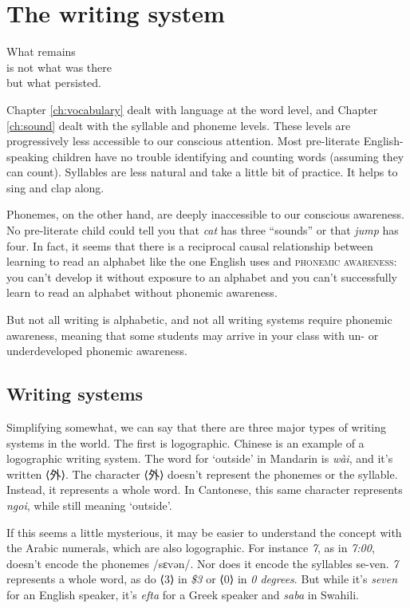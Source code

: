\chapter{The writing system}

\epigraph{What remains\\
is not what was there\\
but what persisted.}{}

Chapter \ref{ch:vocabulary} dealt with language at the word level, and Chapter \ref{ch:sound} dealt with the syllable and phoneme levels. These levels are progressively less accessible to our conscious attention. Most pre-literate English-speaking children have no trouble identifying and counting words (assuming they can count). Syllables are less natural and take a little bit of practice. It helps to sing and clap along. 

Phonemes, on the other hand, are deeply inaccessible to our conscious awareness. No pre-literate child could tell you that \textit{cat} has three ``sounds'' or that \textit{jump} has four. In fact, it seems that there is a reciprocal causal relationship between learning to read an alphabet like the one English uses and \textsc{phonemic awareness}: you can't develop it without exposure to an alphabet and you can't successfully learn to read an alphabet without phonemic awareness.

But not all writing is alphabetic, and not all writing systems require phonemic awareness, meaning that some students may arrive in your class with un- or underdeveloped phonemic awareness.

\section{Writing systems}
Simplifying somewhat, we can say that there are three major types of writing systems in the world. The first is logographic. Chinese is an example of a logographic writing system. The word for `outside' in Mandarin is \textit{wài}, and it's written ⟨外⟩. The character ⟨外⟩ doesn't represent the phonemes or the syllable. Instead, it represents a whole word. In Cantonese, this same character represents \textit{ngoi}, while still meaning `outside'.

If this seems a little mysterious, it may be easier to understand the concept with the Arabic numerals, which are also logographic. For instance \textit{7}, as in \textit{7:00}, doesn't encode the phonemes /sɛvən/. Nor does it encode the syllables se-ven. \textit{7} represents a whole word, as do ⟨3⟩ in \textit{\$3} or ⟨0⟩ in \textit{0 degrees}. But while it's \textit{seven} for an English speaker, it's \textit{efta} for a Greek speaker and \textit{saba} in Swahili.


